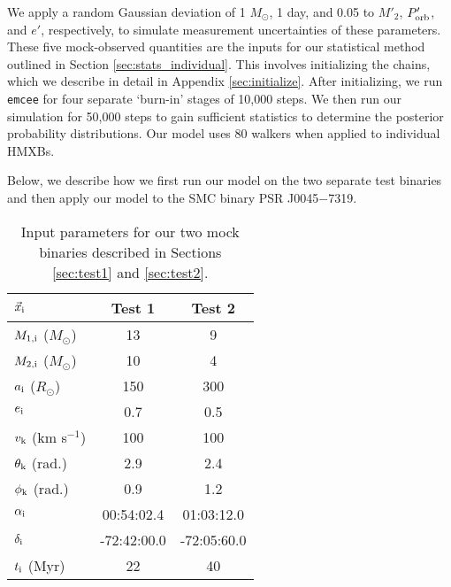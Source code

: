 \documentclass[usenatbib]{mnras}
\newcommand{\Msun}{\ifmmode {M_{\odot}}\else${M_{\odot}}$\fi}
\begin{document}
We apply a random Gaussian deviation of 1 \Msun, 1 day, and 0.05 to $M'_2$, $P'_{\rm orb}$, and $e'$, respectively, to simulate measurement uncertainties of these parameters. These five mock-observed quantities are the inputs for our statistical method outlined in Section \ref{sec:stats_individual}. This involves initializing the chains, which we describe in detail in Appendix \ref{sec:initialize}. After initializing, we run {\tt emcee} for four separate `burn-in' stages of 10,000 steps. We then run our simulation for 50,000 steps to gain sufficient statistics to determine the posterior probability distributions. Our model uses 80 walkers when applied to individual HMXBs.

Below, we describe how we first run our model on the two separate test binaries and then apply our model to the SMC binary PSR J0045$-$7319.


\begin{table}
\begin{center}
\caption{Input parameters for our two mock binaries described in Sections \ref{sec:test1} and \ref{sec:test2}.}
\label{tab:mock_data}
\begin{tabular}{lcc} 
\toprule
$\vec{x}_{\rm i}$ & Test 1 & Test 2 \\
\midrule
$M_{\rm 1,i}$ ($M_{\odot}$) & 13 & 9 \\
$M_{\rm 2,i}$ ($M_{\odot}$) & 10 & 4 \\
$a_{\rm i}$ ($R_{\odot}$) & 150 & 300 \\
$e_{\rm i}$ & 0.7 & 0.5 \\
$v_{\rm k}$ (km s$^{-1}$) & 100 & 100 \\
$\theta_{\rm k}$ (rad.) & 2.9 & 2.4 \\
$\phi_{\rm k}$ (rad.) & 0.9 & 1.2 \\
$\alpha_{\rm i}$ & 00:54:02.4 & 01:03:12.0 \\
$\delta_{\rm i}$ & -72:42:00.0 & -72:05:60.0 \\
$t_{\rm i}$ (Myr) & 22 & 40 \\
\bottomrule
\end{tabular}
\end{center}
\end{table}
\end{document}
